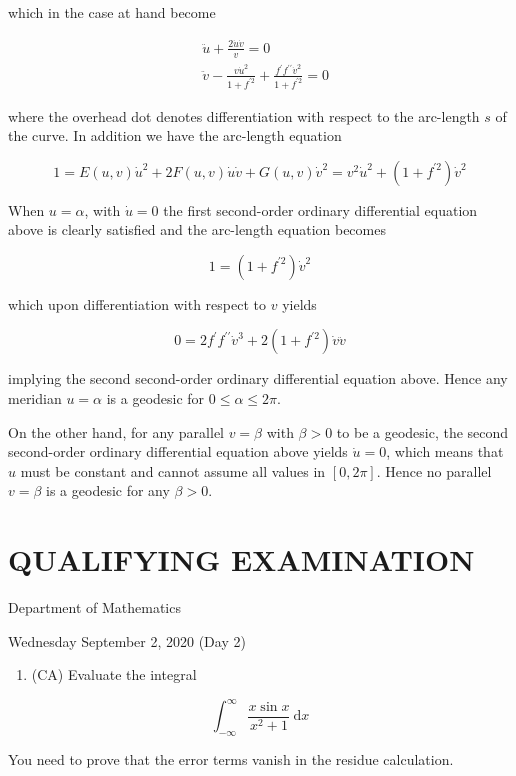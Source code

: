 \documentclass[10pt]{article}
\begin{document}
which in the case at hand become

$$
\begin{aligned}
& \ddot{u}+\frac{2 \dot{u} \dot{v}}{v}=0 \\
& \ddot{v}-\frac{v \dot{u}^{2}}{1+f^{\prime 2}}+\frac{f^{\prime} f^{\prime \prime} \dot{v}^{2}}{1+f^{\prime 2}}=0
\end{aligned}
$$

where the overhead dot denotes differentiation with respect to the arc-length $s$ of the curve. In addition we have the arc-length equation

$$
1=E(u, v) \dot{u}^{2}+2 F(u, v) \dot{u} \dot{v}+G(u, v) \dot{v}^{2}=v^{2} \dot{u}^{2}+\left(1+f^{\prime 2}\right) \dot{v}^{2}
$$

When $u=\alpha$, with $\dot{u}=0$ the first second-order ordinary differential equation above is clearly satisfied and the arc-length equation becomes

$$
1=\left(1+f^{\prime 2}\right) \dot{v}^{2}
$$

which upon differentiation with respect to $v$ yields

$$
0=2 f^{\prime} f^{\prime \prime} \dot{v}^{3}+2\left(1+f^{\prime 2}\right) \dot{v} \ddot{v}
$$

implying the second second-order ordinary differential equation above. Hence any meridian $u=\alpha$ is a geodesic for $0 \leq \alpha \leq 2 \pi$.

On the other hand, for any parallel $v=\beta$ with $\beta>0$ to be a geodesic, the second second-order ordinary differential equation above yields $\dot{u}=0$, which means that $u$ must be constant and cannot assume all values in $[0,2 \pi]$. Hence no parallel $v=\beta$ is a geodesic for any $\beta>0$.

\section*{QUALIFYING EXAMINATION }
Department of Mathematics

Wednesday September 2, 2020 (Day 2)

\begin{enumerate}
  \item (CA) Evaluate the integral
\end{enumerate}

$$
\int_{-\infty}^{\infty} \frac{x \sin x}{x^{2}+1} \mathrm{~d} x
$$

You need to prove that the error terms vanish in the residue calculation.
\end{document}
